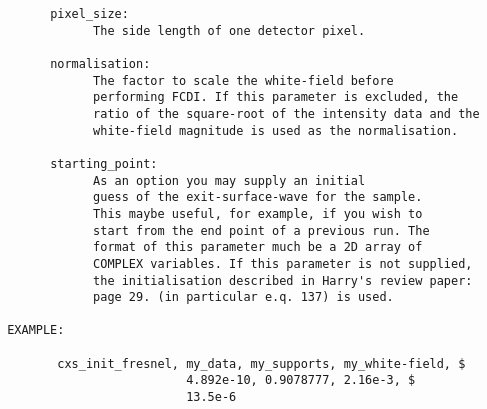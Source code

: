 \begin{verbatim}
       pixel_size:
             The side length of one detector pixel.

       normalisation: 
             The factor to scale the white-field before
             performing FCDI. If this parameter is excluded, the
             ratio of the square-root of the intensity data and the
             white-field magnitude is used as the normalisation.

       starting_point: 
             As an option you may supply an initial 
             guess of the exit-surface-wave for the sample. 
             This maybe useful, for example, if you wish to 
             start from the end point of a previous run. The
             format of this parameter much be a 2D array of
             COMPLEX variables. If this parameter is not supplied,
             the initialisation described in Harry's review paper: 
             page 29. (in particular e.q. 137) is used.

 EXAMPLE:

        cxs_init_fresnel, my_data, my_supports, my_white-field, $
                          4.892e-10, 0.9078777, 2.16e-3, $
                          13.5e-6

\end{verbatim}

